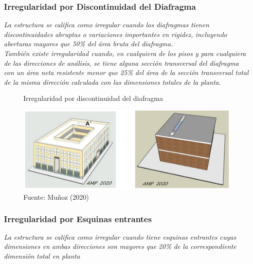 \documentclass{article}%
\begin{document}
%
\subsubsection{Irregularidad por Discontinuidad del Diafragma}%
\label{ssubsec:IrregularidadporDiscontinuidaddelDiafragma}%
\begin{tcolorbox}[colback=gray!5!white,colframe=cyan!75!black,fonttitle=\bfseries,title=Tabla N°9 E-030]%
\textit{La estructura se califica como irregular cuando los diafragmas tienen discontinuidades abruptas o variaciones importantes en rigidez, incluyendo aberturas mayores que 50\% del área bruta del diafragma.} \\ \textit{También  existe  irregularidad  cuando,  en  cualquiera de  los pisos y para cualquiera de las direcciones de análisis, se tiene alguna sección transversal del diafragma con un área neta resistente menor que 25\% del área de la sección transversal total de la misma dirección calculada con las dimensiones totales de la planta.}%
\end{tcolorbox}%
\vspace{-10pt}%


\begin{figure}[H]%
\centering%
\caption{Irregularidad por discontinuidad del diafragma}%
\includegraphics[scale=0.7]{images/i_diafragma.PNG}%
\caption*{\small Fuente: Muñoz (2020)}%
\end{figure}

%
\subsubsection{Irregularidad por Esquinas entrantes}%
\label{ssubsec:IrregularidadporEsquinasentrantes}%
\begin{tcolorbox}[colback=gray!5!white,colframe=cyan!75!black,fonttitle=\bfseries,title=Tabla N°9 E-030]%
\textit{La estructura se califica como irregular cuando tiene esquinas entrantes  cuyas  dimensiones  en  ambas  direcciones  son mayores que 20\% de la correspondiente dimensión total en planta}%
\end{tcolorbox}%
\end{document}

